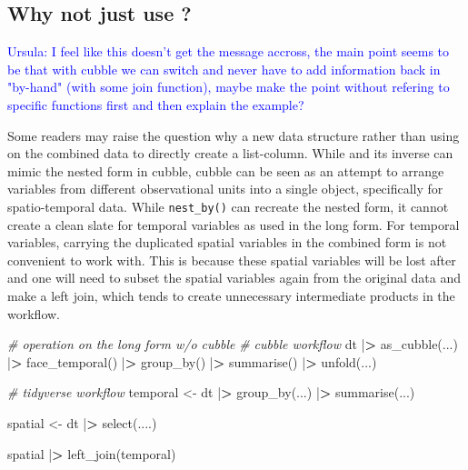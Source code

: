 \documentclass{article}
\newenvironment{Shaded}{\begin{snugshade}}{\end{snugshade}}
\newcommand{\CommentTok}[1]{\textcolor[rgb]{0.56,0.35,0.01}{\textit{#1}}}
\newcommand{\ErrorTok}[1]{\textcolor[rgb]{0.64,0.00,0.00}{\textbf{#1}}}
\newcommand{\FunctionTok}[1]{\textcolor[rgb]{0.00,0.00,0.00}{#1}}
\newcommand{\NormalTok}[1]{#1}
\newcommand{\OtherTok}[1]{\textcolor[rgb]{0.56,0.35,0.01}{#1}}
\newcommand{\SpecialCharTok}[1]{\textcolor[rgb]{0.00,0.00,0.00}{#1}}
\begin{document}
\subsection[Why not just use]{Why not just use ?}

\textcolor{blue}{Ursula: I feel like this doesn't get the message accross, the main point seems to be that with cubble we can switch and never have to add information back in "by-hand" (with some join function), maybe make the point without refering to specific functions first and then explain the example?}

Some readers may raise the question why a new data structure rather than using  on the combined data to directly create a list-column. While  and its inverse  can mimic the nested form in cubble, cubble can be seen as an attempt to arrange variables from different observational units into a single object, specifically for spatio-temporal data. While \texttt{nest\_by()} can recreate the nested form, it cannot create a clean slate for temporal variables as used in the long form. For temporal variables, carrying the duplicated spatial variables in the combined form is not convenient to work with. This is because these spatial variables will be lost after  and one will need to subset the spatial variables again from the original data and make a left join, which tends to create unnecessary intermediate products in the workflow.

\begin{Shaded}
\begin{Highlighting}[]
\CommentTok{\# operation on the long form w/o cubble}
\CommentTok{\# cubble workflow}
\NormalTok{dt }\SpecialCharTok{|}\ErrorTok{\textgreater{}}
  \FunctionTok{as\_cubble}\NormalTok{(...) }\SpecialCharTok{|}\ErrorTok{\textgreater{}}
  \FunctionTok{face\_temporal}\NormalTok{() }\SpecialCharTok{|}\ErrorTok{\textgreater{}}
  \FunctionTok{group\_by}\NormalTok{() }\SpecialCharTok{|}\ErrorTok{\textgreater{}}
  \FunctionTok{summarise}\NormalTok{() }\SpecialCharTok{|}\ErrorTok{\textgreater{}}
  \FunctionTok{unfold}\NormalTok{(...)}

\CommentTok{\# tidyverse workflow}
\NormalTok{temporal }\OtherTok{\textless{}{-}}\NormalTok{ dt }\SpecialCharTok{|}\ErrorTok{\textgreater{}}
  \FunctionTok{group\_by}\NormalTok{(...) }\SpecialCharTok{|}\ErrorTok{\textgreater{}}
  \FunctionTok{summarise}\NormalTok{(...)}

\NormalTok{spatial }\OtherTok{\textless{}{-}}\NormalTok{ dt }\SpecialCharTok{|}\ErrorTok{\textgreater{}} \FunctionTok{select}\NormalTok{(....)}

\NormalTok{spatial }\SpecialCharTok{|}\ErrorTok{\textgreater{}} \FunctionTok{left\_join}\NormalTok{(temporal)}
\end{Highlighting}
\end{Shaded}
\end{document}
